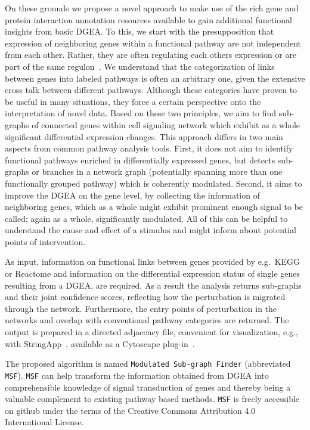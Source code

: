 \documentclass[10pt,a4paper,twocolumn]{article}
\begin{document}
	On these grounds we propose a novel approach to make use of the rich gene
	and protein interaction annotation resources available to gain additional
	functional insights from basic DGEA. To this, we start with the
	presupposition that expression of neighboring genes within a functional
	pathway are not independent from each other. Rather, they are often
	regulating each others expression or are part of the same
	regulon~\cite{Michalak}. We understand that the categorization of links
	between genes into labeled pathways is often an arbitrary one, given the
	extensive cross talk between different pathways. Although these categories
	have proven to be useful in many situations, they force a certain
	perspective onto the interpretation of novel data. Based on these two
	principles, we aim to find sub-graphs of connected genes within cell
	signaling network which exhibit as a whole significant differential
	expression changes. This approach differs in two main aspects from common
	pathway analysis tools. First, it does not aim to identify functional
	pathways enriched in differentially expressed genes, but detects sub-graphs
	or branches in a network graph (potentially spanning more than one
	functionally grouped pathway) which is coherently modulated. Second, it
	aims to improve the DGEA on the gene level, by collecting the information
	of neighboring genes, which as a whole might exhibit prominent enough
	signal to be called; again as a whole, significantly modulated. All of this can be helpful to understand the cause and effect of a stimulus and might inform about potential points of intervention.
	
	As input, information on functional links between genes provided by
	e.g.~KEGG or Reactome and information on the differential expression status
	of single genes resulting from a DGEA, are required. As a result the
	analysis returns sub-graphs and their joint confidence scores, reflecting
	how the perturbation is migrated through the network. Furthermore, the
	entry points of perturbation in the networks and overlap with conventional
	pathway categories are returned. The output is prepared in a directed
	adjacency file, convenient for visualization, e.g., with
	StringApp~\cite{StringApp}, available as a Cytoscape plug-in~\cite{Cyto}.
	
	The proposed algorithm is named
	\texttt{Modulated Sub-graph Finder} (abbreviated
	\texttt{MSF}). \texttt{MSF} can help transform the information obtained
	from DGEA into comprehensible knowledge of signal transduction of genes and
	thereby being a valuable complement to existing pathway based
	methods.  \texttt{MSF} is freely accessible on github under the terms of the
	Creative Commons Attribution 4.0 International License.
	
\end{document}
